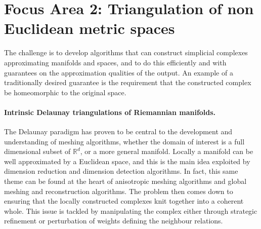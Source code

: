 %

\newcommand{\man}{\mathcal{M}}
\newcommand{\reel}{\mathbb{R}}
\newcommand{\rdee}{\reel^d}
\renewcommand{\pts}{P}
\newcommand{\mesh}{\hat{M}}

\newcommand{\ramsay}[1]{\framebox{#1}}%

\section*{Focus Area 2: Triangulation of non Euclidean metric spaces}

The challenge is to develop algorithms that can construct simplicial
complexes approximating manifolds and spaces, and to do
this efficiently and with guarantees on the approximation qualities of
the output.
%
An example of a traditionally desired guarantee is the requirement
that the constructed complex be homeomorphic to the original space.

\paragraph{Intrinsic Delaunay triangulations of Riemannian manifolds.}

The Delaunay paradigm has proven to be central to the development and
understanding of meshing algorithms, whether the domain of interest is
a full dimensional subset of $\rdee$, or a more general manifold. 
%
Locally a manifold can be well approximated by a Euclidean space, and
this is the main idea exploited by dimension reduction and dimension
detection algorithms. In fact, this same theme can be found at the
heart of anisotropic meshing algorithms and global meshing and
reconstruction algorithms. The problem then comes down to ensuring
that the locally constructed complexes knit together into a coherent
whole. This issue is tackled by manipulating the complex either
through strategic refinement or perturbation of weights defining the
neighbour relations. 

